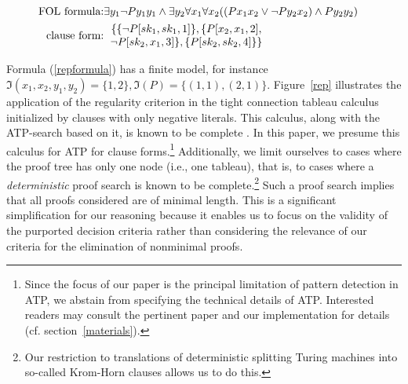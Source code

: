 \documentclass[%
  manuscript=article,   %
  year=2024,
  volume=77,
  doi=10.59203/zfn.77.694,
]{zfn}
\begin{document}
\begin{eqnarray}
\mbox{FOL formula:} & \exists y_{1} \neg Py_{1}y_{1} \wedge \exists y_{2}\forall x_{1}\forall x_{2}((Px_{1}x_{2} \vee \neg Py_{2}x_{2}) \wedge Py_{2}y_{2}) & \label{repformula}  \\
\mbox{clause form:} & \begin{tabular}{c}$\{\{\neg P[sk_1,sk_1,1]\},\{P[x_{2},x_{1},2],$\\
$\neg P[sk_2,x_{1},3]\}, \{P[sk_2,sk_2,4]\}\}$\end{tabular} & \label{repclause}
\end{eqnarray}

Formula (\ref{repformula}) has a finite model, for instance $\Im(x_1,x_2,y_1,y_2) = \{1,2\}, \Im(P) = \{(1,1),(2,1)\}$.
Figure~\ref{rep} illustrates the application of the regularity criterion in the tight connection tableau calculus
initialized by clauses with only negative literals. \label{onenegative} This calculus, along with the ATP-search based on it, is known to be complete  \parencite[cf.][]{LetzStenz}. In this paper, we presume this calculus for ATP for clause forms.\footnote{Since the focus of our paper is the principal limitation of pattern detection in ATP, we abstain from specifying the technical details of ATP. Interested readers may consult the  pertinent paper \parencite{LetzStenz} and our implementation for details (cf. section~\ref{materials}).} Additionally, we limit ourselves to cases where the proof tree has only one node (i.e., one tableau), that is, to cases where a \emph{deterministic} proof search is known to be complete.\footnote{Our restriction to translations of deterministic splitting Turing machines into so-called Krom-Horn clauses allows us to do this.} Such a proof search implies that all proofs considered are of minimal length. This is a significant simplification for our reasoning because it enables us to focus on the validity of the purported decision criteria rather than considering the relevance of our criteria for the elimination of nonminimal proofs.
\end{document}
